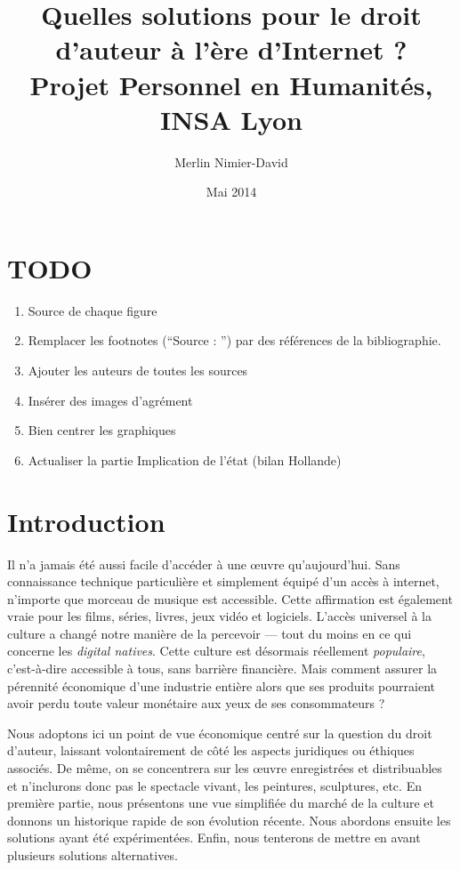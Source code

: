 \documentclass[a4paper]{report}
\title{
	Quelles solutions pour le droit d'auteur à l'ère d'Internet ?\\
	Projet Personnel en Humanités, INSA Lyon
}
\author{Merlin Nimier-David}
\date{Mai 2014}
\begin{document}
	\maketitle

	\tableofcontents

	\chapter{TODO}
	\begin{enumerate}
		\item Source de chaque figure
		\item Remplacer les footnotes (``Source : '') par des références de la bibliographie.
		\item Ajouter les auteurs de toutes les sources
		\item Insérer des images d'agrément
		\item Bien centrer les graphiques
		\item Actualiser la partie Implication de l'état (bilan Hollande)
	\end{enumerate}


	\chapter{Introduction}
	Il n'a jamais été aussi facile d'accéder à une œuvre qu'aujourd'hui. Sans connaissance technique particulière et simplement équipé d'un accès à internet, n'importe que morceau de musique est accessible. Cette affirmation est également vraie pour les films, séries, livres, jeux vidéo et logiciels. L'accès universel à la culture a changé notre manière de la percevoir — tout du moins en ce qui concerne les \emph{digital natives}. Cette culture est désormais réellement \emph{populaire}, c'est-à-dire accessible à tous, sans barrière financière. Mais comment assurer la pérennité économique d'une industrie entière alors que ses produits pourraient avoir perdu toute valeur monétaire aux yeux de ses consommateurs ?

	Nous adoptons ici un point de vue économique centré sur la question du droit d'auteur, laissant volontairement de côté les aspects juridiques ou éthiques associés. De même, on se concentrera sur les œuvre enregistrées et distribuables et n'inclurons donc pas le spectacle vivant, les peintures, sculptures, etc. En première partie, nous présentons une vue simplifiée du marché de la culture et donnons un historique rapide de son évolution récente. Nous abordons ensuite les solutions ayant été expérimentées. Enfin, nous tenterons de mettre en avant plusieurs solutions alternatives.
\end{document}

